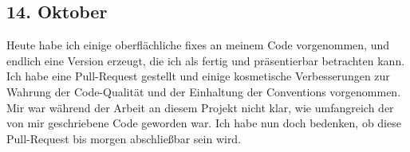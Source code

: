 \subsection{14. Oktober}
Heute habe ich einige oberflächliche fixes an meinem Code vorgenommen, und endlich eine Version erzeugt, die ich als fertig und präsentierbar betrachten kann. Ich habe eine Pull-Request gestellt und einige kosmetische Verbesserungen zur Wahrung der Code-Qualität und der Einhaltung der Conventions vorgenommen. Mir war während der Arbeit an diesem Projekt nicht klar, wie umfangreich der von mir geschriebene Code geworden war. Ich habe nun doch bedenken, ob diese Pull-Request bis morgen abschließbar sein wird.